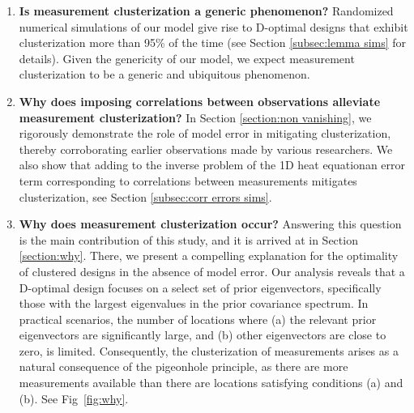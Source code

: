 \begin{enumerate}
\item \label{q:generic} \textbf{Is measurement clusterization a
  generic phenomenon?}
  Randomized numerical simulations of our model give rise to D-optimal
  designs that exhibit clusterization more than 95\% of the time (see
  Section \ref{subsec:lemma sims} for details). Given the genericity
  of our model, we expect measurement clusterization to be a generic
  and ubiquitous phenomenon.

\item \label{q:mitigate} \textbf{Why does imposing correlations
  between observations alleviate measurement clusterization?} In
  Section \ref{section:non vanishing}, we rigorously demonstrate the
  role of model error in mitigating clusterization, thereby
  corroborating earlier observations made by various researchers. We
  also show that adding to the inverse problem of the 1D heat
  equationan error term corresponding to correlations between
  measurements mitigates clusterization, see Section \ref{subsec:corr
    errors sims}.

\item \label{q:why} \textbf{Why does measurement clusterization
  occur?} Answering this question is the main contribution of this
  study, and it is arrived at in Section \ref{section:why}. There, we
  present a compelling explanation for the optimality of clustered
  designs in the absence of model error. Our analysis reveals that a
  D-optimal design focuses on a select set of prior eigenvectors,
  specifically those with the largest eigenvalues in the prior
  covariance spectrum. In practical scenarios, the number of locations
  where (a) the relevant prior eigenvectors are significantly large,
  and (b) other eigenvectors are close to zero, is
  limited. Consequently, the clusterization of measurements arises as
  a natural consequence of the pigeonhole principle, as there are more
  measurements available than there are locations satisfying
  conditions (a) and (b). See Fig~\ref{fig:why}.



\end{enumerate}
